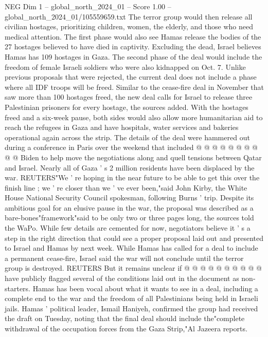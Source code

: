 \begin{textsample}{NEG Dim 1 – global\_north\_2024\_01 – Score 1.00 – global\_north\_2024\_01/105559659.txt}  \label{ex:f1_neg_330}
The terror group would then release all civilian hostages, prioritizing children, women, the elderly, and those who need medical attention.
The first phase would also see Hamas release the bodies of the 27 hostages believed to have died in captivity.
Excluding the dead, Israel believes Hamas has 109 hostages in Gaza.
The second phase of the deal would include the freedom of female Israeli soldiers who were also kidnapped on Oct. 7.
Unlike previous proposals that were rejected, the current deal does not include a phase where all IDF troops will be freed.
Similar to the cease-fire deal in November that saw more than 100 hostages freed, the new deal calls for Israel to release three Palestinian prisoners for every hostage, the sources added.
With the hostages freed and a six-week pause, both sides would also allow more humanitarian aid to reach the refugees in Gaza and have hospitals, water services and bakeries operational again across the strip.
The details of the deal were hammered out during a conference in Paris over the weekend that included @ @ @ @ @ @ @ @ @ @ Biden to help move the negotiations along and quell tensions between Qatar and Israel.
Nearly all of Gaza ' s 2 million residents have been displaced by the war.
REUTERS"We ' re hoping in the near future to be able to get this over the finish line ; we ' re closer than we ' ve ever been,"said John Kirby, the White House National Security Council spokesman, following Burns ' trip.
Despite its ambitious goal for an elusive pause in the war, the proposal was described as a bare-bones"framework"said to be only two or three pages long, the sources told the WaPo.
While few details are cemented for now, negotiators believe it ' s a step in the right direction that could see a proper proposal laid out and presented to Israel and Hamas by next week.
While Hamas has called for a deal to include a permanent cease-fire, Israel said the war will not conclude until the terror group is destroyed.
REUTERS But it remains unclear if @ @ @ @ @ @ @ @ @ @ have publicly flagged several of the conditions laid out in the document as non-starters.
Hamas has been vocal about what it wants to see in a deal, including a complete end to the war and the freedom of all Palestinians being held in Israeli jails.
Hamas ' political leader, Ismail Haniyeh, confirmed the group had received the draft on Tuesday, noting that the final deal should include the"complete withdrawal of the occupation forces from the Gaza Strip,"Al Jazeera reports.

\end{textsample}
